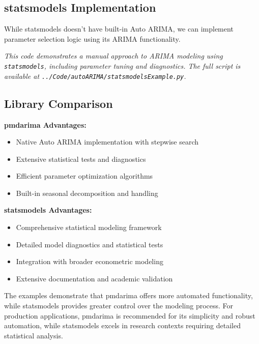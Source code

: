 \subsection{statsmodels Implementation}
\label{subsec:statsmodels_example}

While statsmodels doesn't have built-in Auto ARIMA, we can implement parameter selection logic using its ARIMA functionality.


\noindent\textit{This code demonstrates a manual approach to ARIMA modeling using \texttt{statsmodels}, including parameter tuning and diagnostics. The full script is available at \texttt{../Code/autoARIMA/statsmodelsExample.py}.}

\subsection{Library Comparison}
\label{subsec:library_comparison}

\textbf{pmdarima Advantages:}
\begin{itemize}
	\item Native Auto ARIMA implementation with stepwise search
	\item Extensive statistical tests and diagnostics
	\item Efficient parameter optimization algorithms
	\item Built-in seasonal decomposition and handling
\end{itemize}

\textbf{statsmodels Advantages:}
\begin{itemize}
	\item Comprehensive statistical modeling framework
	\item Detailed model diagnostics and statistical tests
	\item Integration with broader econometric modeling
	\item Extensive documentation and academic validation
\end{itemize}

The examples demonstrate that pmdarima offers more automated functionality, while statsmodels provides greater control over the modeling process. For production applications, pmdarima is recommended for its simplicity and robust automation, while statsmodels excels in research contexts requiring detailed statistical analysis.

